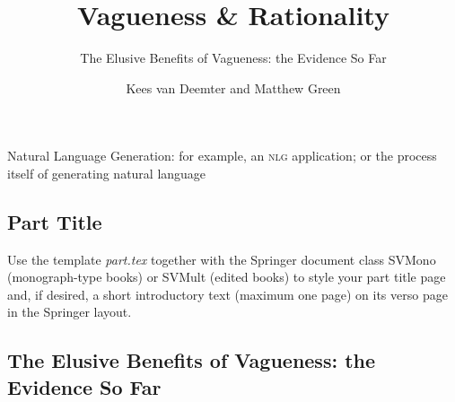 \documentclass[graybox,envcountchap,sectrefs%
,footinfo
]{svmono}
\begin{document}
\author{Kees van Deemter and Matthew Green}
\title{Vagueness \& Rationality}
\subtitle{The Elusive Benefits of Vagueness: the Evidence So Far}
\maketitle

\frontmatter
\tableofcontents

\begin{description}
\item[\textsc{nlg}]{Natural Language Generation: for example, an \textsc{nlg} application; or the process itself of generating natural language}
\end{description}

\mainmatter

\begin{partbacktext}
\part{Part Title}
\noindent Use the template \emph{part.tex} together with the Springer document class SVMono (monograph-type books) or SVMult (edited books) to style your part title page and, if desired, a short introductory text (maximum one page) on its verso page in the Springer layout.

\end{partbacktext}

\chapter{The Elusive Benefits of Vagueness: the Evidence So Far}
\label{intro} %
\end{document}
